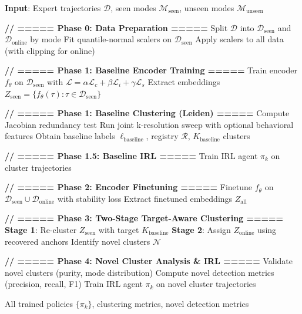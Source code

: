 \documentclass{article}
\begin{document}
\begin{algorithm}[H]
\caption{CoMI-IRL: Complete Pipeline}
\begin{algorithmic}[1]
\STATE \textbf{Input}: Expert trajectories $\mathcal{D}$, seen modes $\mathcal{M}_{\text{seen}}$, unseen modes $\mathcal{M}_{\text{unseen}}$

\STATE
\STATE \textbf{// ===== Phase 0: Data Preparation =====}
\STATE Split $\mathcal{D}$ into $\mathcal{D}_{\text{seen}}$ and $\mathcal{D}_{\text{online}}$ by mode
\STATE Fit quantile-normal scalers on $\mathcal{D}_{\text{seen}}$
\STATE Apply scalers to all data (with clipping for online)

\STATE
\STATE \textbf{// ===== Phase 1: Baseline Encoder Training =====}
\STATE Train encoder $f_\theta$ on $\mathcal{D}_{\text{seen}}$ with $\mathcal{L} = \alpha\mathcal{L}_c + \beta\mathcal{L}_i + \gamma\mathcal{L}_s$
\STATE Extract embeddings $Z_{\text{seen}} = \{f_\theta(\tau) : \tau \in \mathcal{D}_{\text{seen}}\}$

\STATE
\STATE \textbf{// ===== Phase 1: Baseline Clustering (Leiden) =====}
\STATE Compute Jacobian redundancy test
\STATE Run joint k-resolution sweep with optional behavioral features
\STATE Obtain baseline labels $\ell_{\text{baseline}}$, registry $\mathcal{R}$, $K_{\text{baseline}}$ clusters

\STATE
\STATE \textbf{// ===== Phase 1.5: Baseline IRL =====}
    \STATE Train IRL agent $\pi_k$ on cluster trajectories
\ENDFOR

\STATE
\STATE \textbf{// ===== Phase 2: Encoder Finetuning =====}
\STATE Finetune $f_\theta$ on $\mathcal{D}_{\text{seen}} \cup \mathcal{D}_{\text{online}}$ with stability loss
\STATE Extract finetuned embeddings $Z_{\text{all}}$

\STATE
\STATE \textbf{// ===== Phase 3: Two-Stage Target-Aware Clustering =====}
\STATE \textbf{Stage 1}: Re-cluster $Z_{\text{seen}}$ with target $K_{\text{baseline}}$
\STATE \textbf{Stage 2}: Assign $Z_{\text{online}}$ using recovered anchors
\STATE Identify novel clusters $\mathcal{N}$

\STATE
\STATE \textbf{// ===== Phase 4: Novel Cluster Analysis \& IRL =====}
\STATE Validate novel clusters (purity, mode distribution)
\STATE Compute novel detection metrics (precision, recall, F1)
    \STATE Train IRL agent $\pi_k$ on novel cluster trajectories
\ENDFOR

\STATE
\RETURN All trained policies $\{\pi_k\}$, clustering metrics, novel detection metrics
\end{algorithmic}
\end{algorithm}
\end{document}
